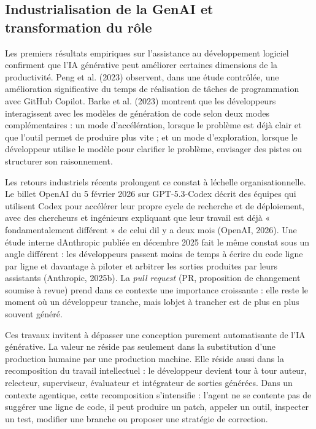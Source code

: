 \subsection{Industrialisation de la GenAI et transformation du r\^ole}\label{rev-genai-industrialisation}

Les premiers résultats empiriques sur l'assistance au développement logiciel confirment que l'IA générative peut améliorer certaines dimensions de la productivité. Peng et al. (2023) observent, dans une étude contrôlée, une amélioration significative du temps de réalisation de tâches de programmation avec GitHub Copilot. Barke et al. (2023) montrent que les développeurs interagissent avec les modèles de génération de code selon deux modes complémentaires : un mode d'accélération, lorsque le problème est déjà clair et que l'outil permet de produire plus vite ; et un mode d'exploration, lorsque le développeur utilise le modèle pour clarifier le problème, envisager des pistes ou structurer son raisonnement.

Les retours industriels récents prolongent ce constat à
l\textquotesingle échelle organisationnelle. Le billet OpenAI du 5
février 2026 sur GPT-5.3-Codex décrit des équipes qui utilisent Codex
pour accélérer leur propre cycle de recherche et de déploiement, avec
des chercheurs et ingénieurs expliquant que leur travail est déjà «
fondamentalement différent » de celui d\textquotesingle il y a deux mois
(OpenAI, 2026). Une étude interne d\textquotesingle Anthropic publiée en décembre 2025
fait le même constat sous un angle différent : les développeurs passent
moins de temps à écrire du code ligne par ligne et davantage à piloter
et arbitrer les sorties produites par leurs assistants (Anthropic,
2025b). La \emph{pull request} (PR, proposition de changement soumise à
revue) prend dans ce contexte une importance croissante : elle reste le
moment où un développeur tranche, mais l\textquotesingle objet à
trancher est de plus en plus souvent généré.

Ces travaux invitent à dépasser une conception purement automatisante de l'IA générative. La valeur ne réside pas seulement dans la substitution d'une production humaine par une production machine. Elle réside aussi dans la recomposition du travail intellectuel : le développeur devient tour à tour auteur, relecteur, superviseur, évaluateur et intégrateur de sorties générées. Dans un contexte agentique, cette recomposition s'intensifie : l'agent ne se contente pas de suggérer une ligne de code, il peut produire un patch, appeler un outil, inspecter un test, modifier une branche ou proposer une stratégie de correction.

